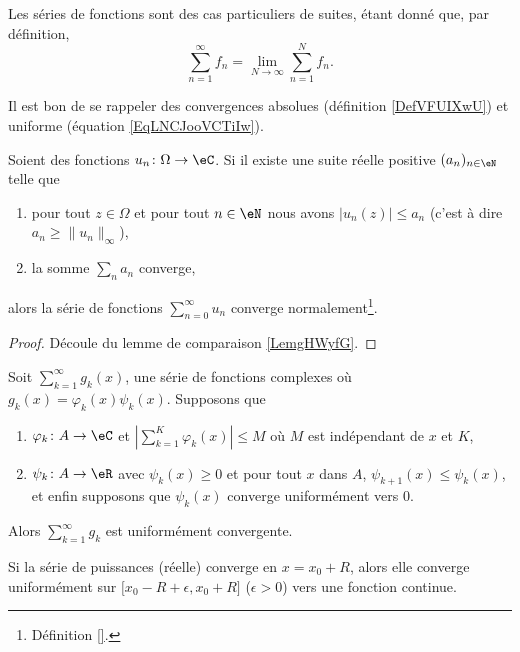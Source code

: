 Les séries de fonctions sont des cas particuliers de suites, étant donné que, par définition,
\begin{equation}
    \sum_{n=1}^{\infty}f_n=\lim_{N\to \infty} \sum_{n=1}^{N}f_n.
\end{equation}

Il est bon de se rappeler des convergences absolues (définition \ref{DefVFUIXwU}) et uniforme (équation \ref{EqLNCJooVCTiIw}).

\begin{lemma}
    Soient des fonctions \( u_n\colon \Omega\to \eC\). Si il existe une suite réelle positive \( (a_n)_{n\in \eN}\) telle que
    \begin{enumerate}
        \item
            pour tout \( z\in \Omega\) et pour tout \( n\in \eN\) nous avons \( | u_n(z) |\leq a_n\) (c'est à dire \( a_n\geq \| u_n \|_{\infty}\)),
        \item
            la somme \( \sum_{n}a_n\) converge,
    \end{enumerate}
    alors la série de fonctions \( \sum_{n=0}^{\infty}u_n\) converge normalement\footnote{Définition \ref{}.}.
\end{lemma}

\begin{proof}
    Découle du lemme de comparaison \ref{LemgHWyfG}.
\end{proof}

\begin{theorem}				\label{ThoSerCritAbel}
	Soit $\sum_{k=1}^{\infty}g_k(x)$, une série de fonctions complexes où $g_k(x)=\varphi_k(x)\psi_k(x)$. Supposons que
	\begin{enumerate}

		\item
			$\varphi_k\colon A\to \eC$ et $| \sum_{k=1}^K\varphi_k(x) |\leq M$ où $M$ est indépendant de $x$ et $K$,
		\item
			$\psi_k\colon A\to \eR$ avec $\psi_k(x)\geq 0$ et pour tout $x$ dans $A$, $\psi_{k+1}(x)\leq \psi_k(x)$, et enfin supposons que $\psi_k(x)$ converge uniformément vers $0$.

	\end{enumerate}
	Alors $\sum_{k=1}^{\infty}g_k$ est uniformément convergente.
\end{theorem}

\begin{theorem}		\label{ThoAbelSeriePuiss}
	Si la série de puissances (réelle) converge en $x=x_0+R$, alors elle converge uniformément sur $\mathopen[ x_0-R+\epsilon , x_0+R \mathclose]$ ($\epsilon>0$) vers une fonction continue.
\end{theorem}


